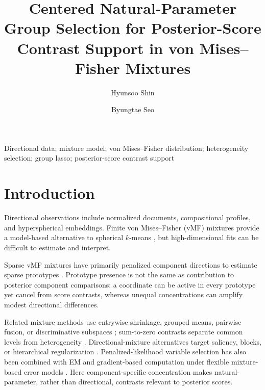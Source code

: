 \documentclass[preprint,12pt,authoryear]{elsarticle}
\def\corref#1{}%
\begin{document}
\begin{frontmatter}
\title{Centered Natural-Parameter Group Selection for Posterior-Score Contrast Support in von Mises--Fisher Mixtures}
\author[aff1]{Hyunsoo Shin}
\author[aff1]{Byungtae Seo\corref{cor1}}
\address[aff1]{Department of Statistics, Sungkyunkwan University, Seoul 03063, Republic of Korea}
\begin{abstract}
\end{abstract}
\begin{keyword}Directional data; mixture model; von Mises--Fisher distribution; heterogeneity selection; group lasso; posterior-score contrast support\end{keyword}
\end{frontmatter}

\section{Introduction}

Directional observations include normalized documents, compositional
profiles, and hyperspherical embeddings. Finite von Mises--Fisher (vMF)
mixtures provide a model-based alternative to spherical $k$-means
\citep{banerjee2005vmf}, but high-dimensional fits can be difficult to estimate
and interpret.

Sparse vMF mixtures have primarily penalized component directions to estimate
sparse prototypes \citep{rossi2022sparsevmf}. Prototype presence is not the
same as contribution to posterior component comparisons: a coordinate can be
active in every prototype yet cancel from score contrasts, whereas unequal
concentrations can amplify modest directional differences.

Related mixture methods use entrywise shrinkage, grouped means, pairwise
fusion, or discriminative subspaces
\citep{pan2007penalized,xie2008grouped,guo2010pairwise,
bouveyron2012fisher,bouveyron2014sparsefisher}; sum-to-zero contrasts separate
common levels from heterogeneity \citep{bondell2009anova}. Directional-mixture
alternatives target saliency, blocks, or hierarchical regularization
\citep{amayri2013online,salah2016coclustering,gopal2014vmf,
taghia2014bayesian,salah2019directional}. Penalized-likelihood variable
selection has also been combined with EM and gradient-based computation under
flexible mixture-based error models \citep{park2025penalized}. Here
component-specific concentration
makes natural-parameter, rather than directional, contrasts relevant to
posterior scores.
\end{document}
